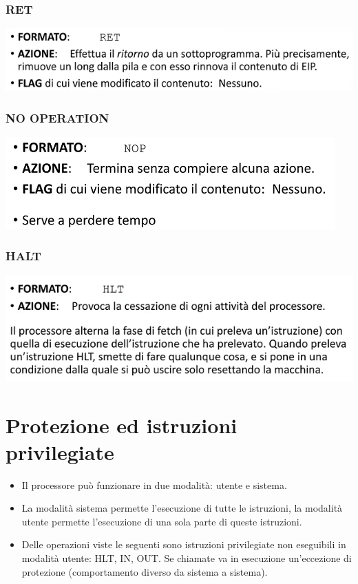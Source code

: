 \documentclass[11pt]{report}
\begin{document}
\subsubsection{RET}
\begin{center}
\includegraphics{img/45.PNG}
\end{center}
\subsubsection{NO OPERATION}
\begin{center}
\includegraphics{img/46.PNG}
\end{center}
\subsubsection{HALT}
\begin{center}
\includegraphics{img/47.PNG}
\end{center}
\section{Protezione ed istruzioni privilegiate}
\begin{itemize}
\item Il processore può funzionare in due modalità: utente e sistema. 
\item La modalità sistema permette l'esecuzione di tutte le istruzioni, la modalità utente permette l'esecuzione di una sola parte di queste istruzioni. 
\item Delle operazioni viste le seguenti sono istruzioni privilegiate non eseguibili in modalità utente: HLT, IN, OUT. Se chiamate va in esecuzione un'eccezione di protezione (comportamento diverso da sistema a sistema).
\end{itemize}
\end{document}
